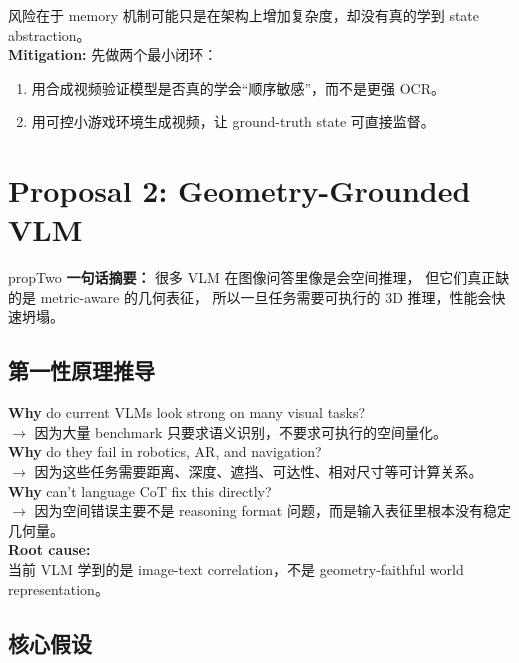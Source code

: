 \documentclass[12pt,a4paper]{article}
\begin{document}
\begin{riskbox}
风险在于 memory 机制可能只是在架构上增加复杂度，却没有真的学到 state abstraction。\\
\textbf{Mitigation:}
先做两个最小闭环：
\begin{enumerate}[leftmargin=2em]
  \item 用合成视频验证模型是否真的学会``顺序敏感''，而不是更强 OCR。
  \item 用可控小游戏环境生成视频，让 ground-truth state 可直接监督。
\end{enumerate}
\end{riskbox}

\newpage
\section{Proposal 2: Geometry-Grounded VLM}

\begin{proposalbox}{propTwo}
\textbf{一句话摘要：}
很多 VLM 在图像问答里像是会空间推理，
但它们真正缺的是 metric-aware 的几何表征，
所以一旦任务需要可执行的 3D 推理，性能会快速坍塌。
\end{proposalbox}

\subsection{第一性原理推导}

\begin{whybox}
\textbf{Why} do current VLMs look strong on many visual tasks?\\
$\rightarrow$ 因为大量 benchmark 只要求语义识别，不要求可执行的空间量化。\\[3pt]
\textbf{Why} do they fail in robotics, AR, and navigation?\\
$\rightarrow$ 因为这些任务需要距离、深度、遮挡、可达性、相对尺寸等可计算关系。\\[3pt]
\textbf{Why} can't language CoT fix this directly?\\
$\rightarrow$ 因为空间错误主要不是 reasoning format 问题，而是输入表征里根本没有稳定几何量。\\[3pt]
\textbf{Root cause:}\\
当前 VLM 学到的是 image-text correlation，不是 geometry-faithful world representation。
\end{whybox}

\subsection{核心假设}
\end{document}
